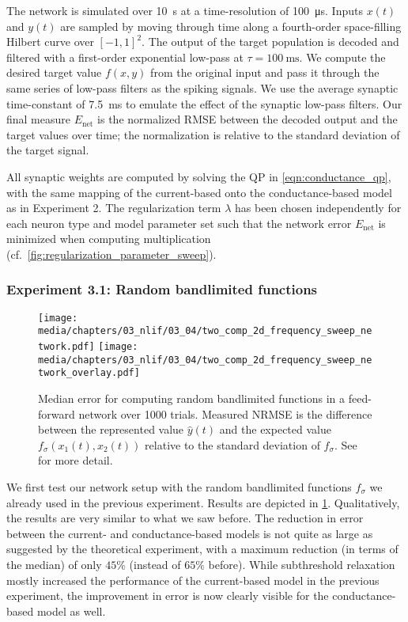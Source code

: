 The network is simulated over \SI{10}{\second} at a time-resolution of \SI{100}{\micro\second}. Inputs $x(t)$ and $y(t)$ are sampled by moving through time along a fourth-order space-filling Hilbert curve over $[-1, 1]^2$. The output of the target population is decoded and filtered with a first-order exponential low-pass at $\tau = \SI{100}{\milli\second}$. We compute the desired target value $f(x, y)$ from the original input and pass it through the same series of low-pass filters as the spiking signals. We use the average synaptic time-constant of \SI{7.5}{\milli\second} to emulate the effect of the synaptic low-pass filters. Our final measure $E_\mathrm{net}$ is the normalized RMSE between the decoded output and the target values over time; the normalization is relative to the standard deviation of the target signal.

All synaptic weights are computed by solving the QP in \cref{eqn:conductance_qp}, with the same mapping of the current-based onto the conductance-based model as in Experiment 2. The regularization term $\lambda$ has been chosen independently for each neuron type and model parameter set such that the network error $E_\mathrm{net}$ is minimized when computing multiplication (cf.~\cref{fig:regularization_parameter_sweep}).

\subsubsection*{Experiment 3.1: Random bandlimited functions}

\begin{figure}[t]
	\centering
	{\texttt{[image: media/chapters/03\_nlif/03\_04/two\_comp\_2d\_frequency\_sweep\_network.pdf]}}%
	\kern-158.06mm\texttt{[image: media/chapters/03\_nlif/03\_04/two\_comp\_2d\_frequency\_sweep\_network\_overlay.pdf]}
	\caption[Median error for computing random bandlimited functions in a feed-forward network over 1000 trials.]{Median error for computing random bandlimited functions in a feed-forward network over 1000 trials. Measured NRMSE is the difference between the represented value $\hat y(t)$ and the expected value $f_\sigma(x_1(t), x_2(t))$ relative to the standard deviation of $f_\sigma$. See  for more detail.}
	\label{fig:frequency_sweep_network}
\end{figure}

We first test our network setup with the random bandlimited functions $f_\sigma$ we already used in the previous experiment. Results are depicted in \cref{fig:frequency_sweep_network}. Qualitatively, the results are very similar to what we saw before. The reduction in error between the current- and conductance-based models is not quite as large as suggested by the theoretical experiment, with a maximum reduction (in terms of the median) of only $45\%$ (instead of $65\%$ before). While subthreshold relaxation mostly increased the performance of the current-based model in the previous experiment, the improvement in error is now clearly visible for the conductance-based model as well.

